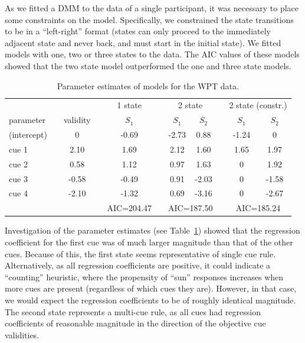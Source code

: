 \documentclass[a4paper,12pt,man]{apa} %
\begin{document}
As we fitted a DMM to the data of a single participant, it was
necessary to place some constraints on the model.  Specifically, we
constrained the state transitions to be in a ``left-right'' format
(states can only proceed to the immediately adjacent state and never
back, and must start in the initial state).  We fitted models with
one, two or three states to the data.  The AIC values of these models
showed that the two state model outperformed the one and three state
models.

\begin{table}
\caption{Parameter estimates of models for the WPT data.}
\label{tab:WPT}
\begin{tabular}{lcccccccccc} \hline
 & & \multicolumn{1}{c}{} && \multicolumn{1}{c}{1 state} & & \multicolumn{2}{c}{2 state} &&
 \multicolumn{2}{c}{2 state (constr.)} \\ \cline{5-5} \cline{7-8} \cline{10-11}
parameter && validity && $S_1$ & & $S_1$ & $S_2$ & & $S_1$ & $S_2$ \\ \hline
(intercept) && 0 && -0.69 & & -2.73 & 0.88 & & -1.24 & 0 \\
cue 1 && 2.10 && 1.69 && 2.12 & 1.60 && 1.65 & 1.97 \\
cue 2 && 0.58 && 1.12 && 0.97 & 1.63 && 0 & 1.92 \\
cue 3 && -0.58 && -0.49 && 0.91 & -2.03 && 0 & -1.58 \\
cue 4 && -2.10 && -1.32 && 0.69 & -3.16 && 0 & -2.67 \\ \hline
 & & & & \multicolumn{1}{c}{AIC=204.47} & & \multicolumn{2}{c}{AIC=187.50} &&
 \multicolumn{2}{c}{AIC=185.24}
\end{tabular}
\end{table}

Investigation of the parameter estimates (see Table~\ref{tab:WPT})
showed that the regression coefficient for the first cue was of much
larger magnitude than that of the other cues.  Because of this, the
first state seems representative of single cue rule.
Alternatively, as all regression coefficients are positive, it could
indicate a ``counting'' heuristic, where the propensity of ``sun''
responses increases when more cues are present (regardless of which
cues they are).  However, in that case, we would expect the regression
coefficients to be of roughly identical magnitude.  The second state
represents a multi-cue rule, as all cues had regression
coefficients of reasonable magnitude in the direction of the objective
cue validities.
\end{document}
